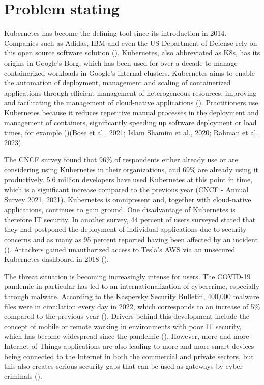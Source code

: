 

\section{Problem stating} \label{cha:problem}


Kubernetes has become the defining tool since its introduction in 2014. Companies such as Adidas, IBM and even the US Department of Defense rely on this open source software solution (\cite{rahman_security_2023}). Kubernetes, also abbreviated as K8s, has its origins in Google's Borg, which has been used for over a decade to manage containerized workloads in Google's internal clusters. Kubernetes aims to enable the automation of deployment, management and scaling of containerized applications through efficient management of heterogeneous resources, improving and facilitating the management of cloud-native applications (\cite{deng_cloud-native_2023}). Practitioners use Kubernetes because it reduces repetitive manual processes in the deployment and management of containers, significantly speeding up software deployment or load times, for example (\cite{bose_under-reported_2021, islam_shamim_xi_2020, rahman_security_2023})(Bose et al., 2021; Islam Shamim et al., 2020; Rahman et al., 2023).

The CNCF survey found that 96\% of respondents either already use or are considering using Kubernetes in their organizations, and 69\% are already using it productively. 5.6 million developers have used Kubernetes at this point in time, which is a significant increase compared to the previous year (CNCF - Annual Survey 2021, 2021). Kubernetes is omnipresent and, together with cloud-native applications, continues to gain ground. One disadvantage of Kubernetes is therefore IT security. In another survey, 44 percent of users surveyed stated that they had postponed the deployment of individual applications due to security concerns and as many as 95 percent reported having been affected by an incident (\cite{shamim_mitigating_2021}). Attackers gained unauthorized access to Tesla's AWS via an unsecured Kubernetes dashboard in 2018 (\cite{islam_shamim_xi_2020}).

The threat situation is becoming increasingly intense for users. The COVID-19 pandemic in particular has led to an internationalization of cybercrime, especially through malware. According to the Kaspersky Security Bulletin, 400,000 malware files were in circulation every day in 2022, which corresponds to an increase of 5\% compared to the previous year (\cite{djenna_artificial_2023}). Drivers behind this development include the concept of mobile or remote working in environments with poor IT security, which has become widespread since the pandemic (\cite{ferreira_recommender_2023}). However, more and more Internet of Things applications are also leading to more and more smart devices being connected to the Internet in both the commercial and private sectors, but this also creates serious security gaps that can be used as gateways by cyber criminals (\cite{empl_soar4iot_2022}).

